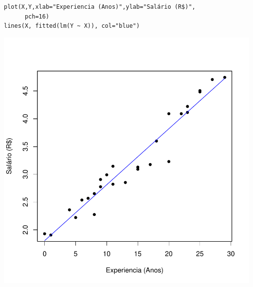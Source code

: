 \documentclass[14pt,aspectratio=1610]{beamer}
\begin{document}
\begin{frame}[fragile]{}
\frametitle{ }
\begin{block}{}
\begin{center}

\begin{verbatim}
plot(X,Y,xlab="Experiencia (Anos)",ylab="Salário (R$)",
      pch=16)
lines(X, fitted(lm(Y ~ X)), col="blue")    
\end{verbatim}
\end{center}
\end{block}
\vspace{-1.3cm}
\begin{center}
\includegraphics{Aula4Regressao/Figuras/Aula4-014}
\end{center}
\end{frame}
\end{document}
